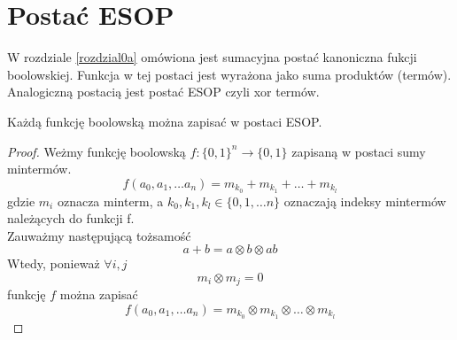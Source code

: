 \section{Postać ESOP}
W rozdziale \ref{rozdzial0a} omówiona jest sumacyjna postać kanoniczna fukcji boolowskiej. Funkcja w tej postaci jest wyrażona jako suma produktów (termów). Analogiczną postacią jest postać ESOP czyli xor termów.
\begin{theorem}
    Każdą funkcję boolowską można zapisać w postaci ESOP.
\end{theorem}
\begin{proof}
    Weżmy funkcję boolowską $f: \{0, 1\}^n \rightarrow \{0, 1\}$ zapisaną w postaci sumy mintermów.
    \[f(a_0, a_1, \ldots a_n) = m_{k_0} + m_{k_1} + \ldots + m_{k_l}\]
    gdzie $m_i$ oznacza minterm, a $k_0, k_1, k_l \in \{0, 1, \ldots n\}$ oznaczają indeksy mintermów należących do funkcji f.\\
    Zauważmy następującą tożsamość
    \[a + b = a \otimes b \otimes ab\]
    Wtedy, ponieważ $\forall i,j$
    \[m_i \otimes m_j = 0\]
    funkcję $f$ można zapisać
    \[f(a_0, a_1, \ldots a_n) = m_{k_0} \otimes m_{k_1} \otimes \ldots \otimes m_{k_l}\]
\end{proof}
